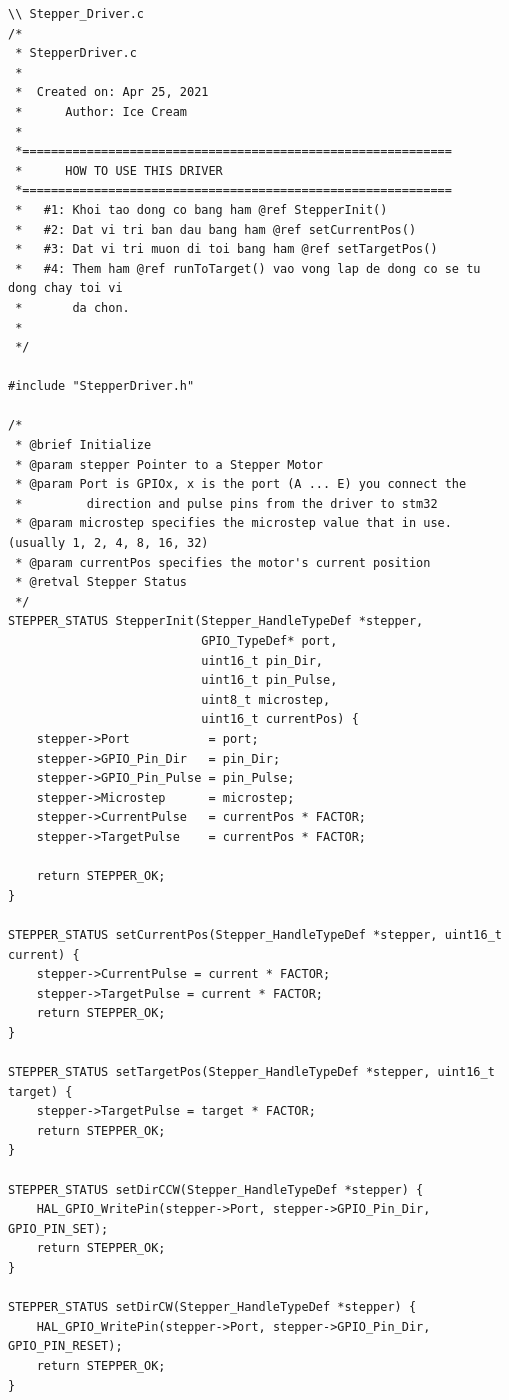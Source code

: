 \begin{lstlisting}
\\ Stepper_Driver.c
/*
 * StepperDriver.c
 *
 *  Created on: Apr 25, 2021
 *      Author: Ice Cream
 *
 *============================================================
 *      HOW TO USE THIS DRIVER
 *============================================================
 *   #1: Khoi tao dong co bang ham @ref StepperInit()
 *   #2: Dat vi tri ban dau bang ham @ref setCurrentPos()
 *   #3: Dat vi tri muon di toi bang ham @ref setTargetPos()
 *   #4: Them ham @ref runToTarget() vao vong lap de dong co se tu dong chay toi vi
 *       da chon.
 *
 */

#include "StepperDriver.h"

/*
 * @brief Initialize
 * @param stepper Pointer to a Stepper Motor
 * @param Port is GPIOx, x is the port (A ... E) you connect the 
 *         direction and pulse pins from the driver to stm32
 * @param microstep specifies the microstep value that in use. (usually 1, 2, 4, 8, 16, 32)
 * @param currentPos specifies the motor's current position 
 * @retval Stepper Status
 */
STEPPER_STATUS StepperInit(Stepper_HandleTypeDef *stepper,
                           GPIO_TypeDef* port,
                           uint16_t pin_Dir,
                           uint16_t pin_Pulse,
                           uint8_t microstep,
                           uint16_t currentPos) {
    stepper->Port           = port;
    stepper->GPIO_Pin_Dir   = pin_Dir;
    stepper->GPIO_Pin_Pulse = pin_Pulse;
    stepper->Microstep      = microstep;
    stepper->CurrentPulse   = currentPos * FACTOR;
    stepper->TargetPulse    = currentPos * FACTOR;

    return STEPPER_OK;
}

STEPPER_STATUS setCurrentPos(Stepper_HandleTypeDef *stepper, uint16_t current) {
    stepper->CurrentPulse = current * FACTOR;
    stepper->TargetPulse = current * FACTOR;
    return STEPPER_OK;
}

STEPPER_STATUS setTargetPos(Stepper_HandleTypeDef *stepper, uint16_t target) {
    stepper->TargetPulse = target * FACTOR;
    return STEPPER_OK;
}

STEPPER_STATUS setDirCCW(Stepper_HandleTypeDef *stepper) {
    HAL_GPIO_WritePin(stepper->Port, stepper->GPIO_Pin_Dir, GPIO_PIN_SET);
    return STEPPER_OK;
}

STEPPER_STATUS setDirCW(Stepper_HandleTypeDef *stepper) {
    HAL_GPIO_WritePin(stepper->Port, stepper->GPIO_Pin_Dir, GPIO_PIN_RESET);
    return STEPPER_OK;
}


\end{lstlisting}
